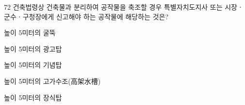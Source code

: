 \begin{question}{72}
건축법령상 건축물과 분리하여 공작물을 축조할 경우 특별자치도지사 또는 시장ㆍ군수ㆍ구청장에게 신고해야 하는 공작물에 해당하는 것은?
\begin{choices}
  \item 높이 5미터의 굴뚝
  \item 높이 5미터의 광고탑
  \item 높이 5미터의 기념탑
  \item 높이 5미터의 고가수조(高架水槽)
  \item 높이 5미터의 장식탑
\end{choices}
\end{question}
